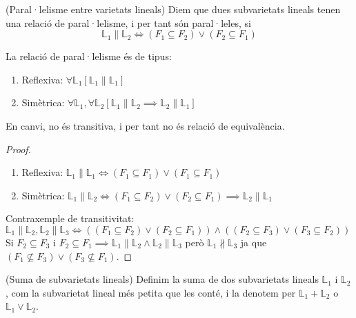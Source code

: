 \begin{defn}(Paral·lelisme entre varietats lineals)
	Diem que dues subvarietats lineals tenen una relació de paral·lelisme, i per tant són paral·leles, si
	\[\mathbb{L}_1\parallel\mathbb{L}_2\iff (F_1\subseteq F_2)\lor (F_2\subseteq F_1)\]
\end{defn}

\begin{prop}
	La relació de paral·lelisme és de tipus:
	\begin{enumerate}
		\item Reflexiva: $\forall\mathbb{L}_1[\mathbb{L}_1\parallel\mathbb{L}_1]$
		\item Simètrica: $\forall\mathbb{L}_1,\forall\mathbb{L}_2 [\mathbb{L}_1\parallel\mathbb{L}_2\implies\mathbb{L}_2\parallel\mathbb{L}_1]$
	\end{enumerate}
	En canvi, no és transitiva, i per tant no és relació de equivalència.
\end{prop}
\begin{proof}\begin{enumerate}
	\item Reflexiva: $\mathbb{L}_1\parallel\mathbb{L}_1\iff (F_1\subseteq F_1)\lor (F_1\subseteq F_1)$
	\item Simètrica: $\mathbb{L}_1\parallel\mathbb{L}_2\iff (F_1\subseteq F_2)\lor (F_2\subseteq F_1)\implies\mathbb{L}_2\parallel\mathbb{L}_1$
	\end{enumerate}
	Contraxemple de transitivitat: $\mathbb{L}_1\parallel\mathbb{L}_2,\mathbb{L}_2\parallel\mathbb{L}_3\iff ((F_1\subseteq F_2)\lor (F_2\subseteq F_1))\land((F_2\subseteq F_3)\lor (F_3\subseteq F_2))$
	Si $F_2\subseteq F_3$ i $F_2\subseteq F_1\implies\mathbb{L}_1\parallel\mathbb{L}_2\land\mathbb{L}_2\parallel\mathbb{L}_3$ però $\mathbb{L}_1\nparallel\mathbb{L}_3$ ja que $(F_1\nsubseteq F_3)\lor (F_3\nsubseteq F_1)$.
\end{proof}

\begin{defn}(Suma de subvarietats lineals)
	Definim la suma de dos subvarietats lineals $\mathbb{L}_1$ i $\mathbb{L}_2$, com la subvarietat lineal més petita que les conté, i la denotem per $\mathbb{L}_1+\mathbb{L}_2$ o $\mathbb{L}_1\lor\mathbb{L}_2$.
\end{defn}

